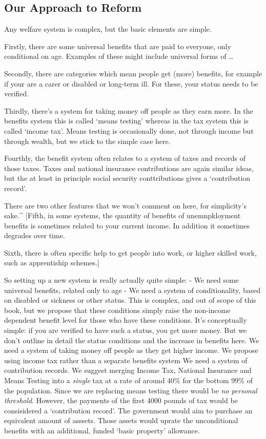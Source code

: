 \documentclass[]{tufte-handout}
\begin{document}
\hypertarget{our-approach-to-reform}{%
\subsection{Our Approach to Reform}\label{our-approach-to-reform}}

Any welfare system is complex, but the basic elements are simple.

Firstly, there are some universal benefits that are paid to everyone,
only conditional on age. Examples of these might include universal forms
of \ldots{}

Secondly, there are categories which mean people get (more) benefits,
for example if your are a carer or disabled or long-term ill. For these,
your status needs to be verified.

Thirdly, there's a system for taking money off people as they earn more.
In the benefits system this is called `means testing' whereas in the tax
system this is called `income tax'. Means testing is occasionally done,
not through income but through wealth, but we stick to the simple case
here.

Fourthly, the benefit system often relates to a system of taxes and
records of those taxes. Taxes and national insurance contributions are
again similar ideas, but the at least in principle social security
conttributions gives a `contribution record'.

There are two other features that we won't comment on here, for
simplicity's sake.\^{} {[}Fifth, in some systems, the quantity of
benefits of unemnpkloyment benefits is sometimes related to your current
income. In addition it sometimes degrades over time.

Sixth, there is often specific help to get people into work, or higher
skilled work, such as apprentiship schemes.{]}

So setting up a new system is really actually quite simple: - We need
some universal benefits, related only to age - We need a system of
conditionality, based on disabled or sickness or other status. This is
complex, and out of scope of this book, but we propose that these
conditions simply raise the non-income dependent benefit level for those
who have these conditions. It's conceptually simple: if you are verified
to have such a status, you get more money. But we don't outline in
detail the status conditions and the increase in benefits here. We need
a system of taking money off people as they get higher income. We
propose using income tax rather than a separate benefits system We need
a system of contribution records. We suggest merging Income Tax,
National Insurance and Means Testing into a \emph{single} tax at a rate
of around 40\% for the bottom 99\% of the population. Since we are
replacing means testing there would be \emph{no personal threshold}.
However, the payments of the first 4000 pounds of tax would be
consisidered a `contribution record'. The government would aim to
purchase an equivalent amount of asssets. Those assets would uprate the
unconditional benefits with an additional, funded `basic property'
allowance.
\end{document}
